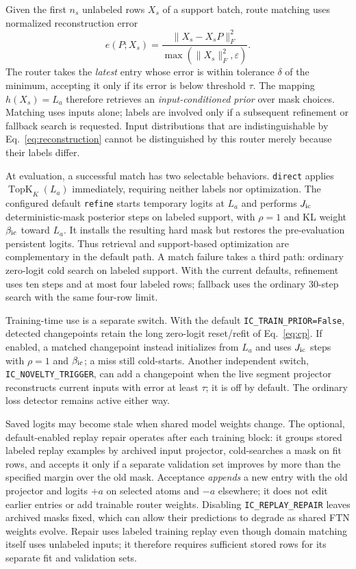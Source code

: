 \documentclass[11pt]{article}
\newcommand{\TopK}{\operatorname{TopK}}
\begin{document}
Given the first $n_s$ unlabeled rows $X_s$ of a support batch, route matching
uses normalized reconstruction error
\begin{equation}
 e(P;X_s)=\frac{\|X_s-X_sP\|_F^2}{\max(\|X_s\|_F^2,\varepsilon)}.
 \label{eq:reconstruction}
\end{equation}
The router takes the \emph{latest} entry whose error is within tolerance
$\delta$ of the minimum, accepting it only if its error is below threshold
$\tau$. The mapping $h(X_s)=L_a$ therefore retrieves an
\emph{input-conditioned prior} over mask choices. Matching uses inputs alone;
labels are involved only if a subsequent refinement or fallback search is
requested. Input distributions
that are indistinguishable by Eq.~\eqref{eq:reconstruction} cannot be
distinguished by this router merely because their labels differ.

At evaluation, a successful match has two selectable behaviors.
\texttt{direct} applies $\TopK_K(L_a)$ immediately, requiring neither labels
nor optimization. The configured default \texttt{refine} starts temporary
logits at $L_a$ and performs $J_{\rm ic}$ deterministic-mask posterior steps
on labeled support, with $\rho=1$ and KL weight $\beta_{\rm ic}$ toward
$L_a$. It installs the resulting hard mask but restores the pre-evaluation
persistent logits. Thus retrieval and support-based optimization are
complementary in the default path. A match failure takes a third path:
ordinary zero-logit cold search on labeled support. With the current
defaults, refinement uses ten steps and at most four labeled rows; fallback
uses the ordinary 30-step search with the same four-row limit.

Training-time use is a separate switch. With the default
\texttt{IC\_TRAIN\_PRIOR=False}, detected changepoints retain the long
zero-logit reset/refit of Eq.~\eqref{eq:cp}. If enabled, a matched
changepoint instead initializes from $L_a$ and uses $J_{\rm ic}$ steps with
$\rho=1$ and $\beta_{\rm ic}$; a miss still cold-starts. Another independent
switch, \texttt{IC\_NOVELTY\_TRIGGER}, can add a changepoint when the live
segment projector reconstructs current inputs with error at least $\tau$;
it is off by default. The ordinary loss detector remains active either way.

Saved logits may become stale when shared model weights change. The optional,
default-enabled replay repair operates after each training block: it groups stored
labeled replay examples by archived input projector, cold-searches a mask on
fit rows, and accepts it only if a separate validation set improves by more
than the specified margin over the old mask. Acceptance \emph{appends} a new
entry with the old projector and logits $+a$ on selected atoms and $-a$
elsewhere; it does not edit earlier entries or add trainable router weights.
Disabling \texttt{IC\_REPLAY\_REPAIR} leaves archived masks fixed, which can
allow their predictions to degrade as shared FTN weights evolve. Repair uses
labeled training replay even though domain matching itself uses unlabeled
inputs; it therefore requires sufficient stored rows for its separate fit
and validation sets.
\end{document}
